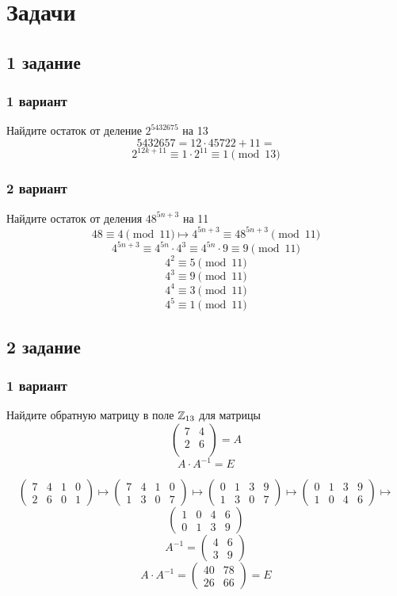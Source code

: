 \section{Задачи}
\subsection{1 задание }
\subsubsection{1 вариант}
Найдите остаток от деление $2^{5432675}$ на 13
$$5432657 = 12\cdot45722 + 11  =  $$
$$2^{12k +11} \equiv  1\cdot2^{11}\equiv 1\pmod{13} $$
\subsubsection{2 вариант}
Найдите остаток от деления $48^{5n+3}$ на 11 \\
$$48 \equiv 4 \pmod{11}\longmapsto 4^{5n+3}\equiv 48^{5n+3} \pmod{11}  $$
$$4^{5n+3} \equiv  4^{5n}\cdot 4^3 \equiv 4^{5n}\cdot 9 \equiv 9 \pmod{11} $$
$$4^2 \equiv 5 \pmod{11}$$  
$$4^3 \equiv 9 \pmod{11} $$
$$4^4 \equiv 3\pmod{11} $$
$$4^5 \equiv 1 \pmod{11}$$
\subsection{2 задание }
\subsubsection{1 вариант}
Найдите обратную матрицу в поле $\mathbb{Z}_{13}$ для матрицы 
$$\begin{pmatrix}
	7 & 4 \\2 & 6\\
\end{pmatrix} = A$$
$$A\cdot A^{-1} = E$$

\[
\left(
\begin{array}{cc|cc}
7 & 4 & 1 & 0 \\
2 & 6 & 0 & 1
\end{array}
\right)\longmapsto \left(
\begin{array}{cc|cc}
7 & 4 & 1 & 0 \\
1 & 3 & 0 & 7
\end{array}
\right)\longmapsto \left( \begin{array}{cc|cc}
0 & 1 & 3 & 9 \\
1 & 3 & 0 & 7
\end{array}\right)
\longmapsto \left( \begin{array}{cc|cc}
0 & 1 & 3 & 9 \\
1 & 0 & 4 & 6
\end{array}\right) \longmapsto
\]
\[
 \left( \begin{array}{cc|cc}
	1 & 0 & 4 & 6\\
	0 & 1 & 3 & 9 
\end{array}\right) 
\]
$$A^{-1} = \begin{pmatrix}4 & 6\\ 3 & 9\end{pmatrix}$$
$$A\cdot A^{-1} = \begin{pmatrix}40 & 78 \\ 26 & 66\end{pmatrix} = E$$
